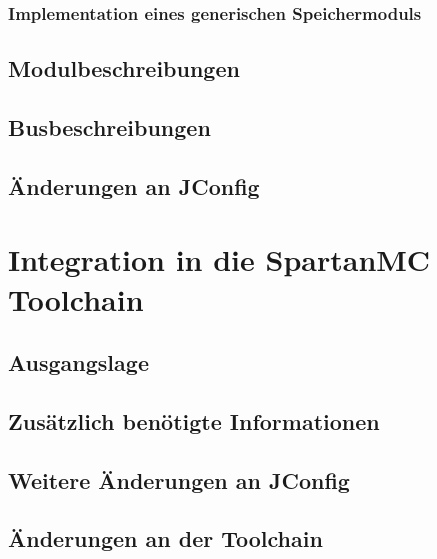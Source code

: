 \subsubsection{Implementation eines generischen Speichermoduls} \label{subsubsec:genMem}

\subsection{Modulbeschreibungen}

\subsection{Busbeschreibungen}

\subsection{Änderungen an JConfig}

\section{Integration in die SpartanMC Toolchain}
\subsection{Ausgangslage}

\subsection{Zusätzlich benötigte Informationen}

\subsection{Weitere Änderungen an JConfig}

\subsection{Änderungen an der Toolchain}

